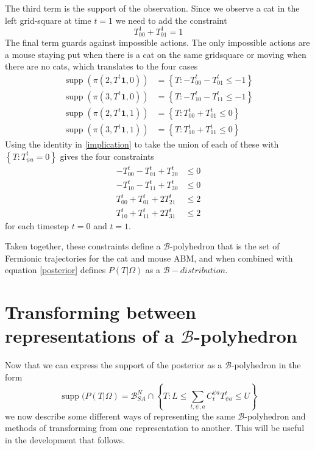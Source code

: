 \documentclass{article}
\DeclareMathOperator\supp{supp}
\begin{document}
The third term is the support of the observation. Since we observe a cat in the left grid-square at time $t=1$ we need to add the constraint
\[
T^1_{0 0} + T^1_{0 1} = 1
\]
The final term guards against impossible actions. The only impossible actions are a mouse staying put when there is a cat on the same gridsquare or moving when there are no cats, which translates to the four cases
\[
\begin{aligned}
\supp(\pi(2,T^t\mathbf{1},0)) &= \left\{ T: -T^t_{0 0} - T^t_{0 1} \le -1 \right\}\\
\supp(\pi(3,T^t\mathbf{1},0)) &= \left\{ T: -T^t_{1 0} - T^t_{1 1} \le -1 \right\}\\
\supp(\pi(2,T^t\mathbf{1},1)) &= \left\{ T: T^t_{0 0} + T^t_{0 1} \le 0 \right\}\\
\supp(\pi(3,T^t\mathbf{1},1)) &= \left\{ T: T^t_{1 0} + T^t_{1 1} \le 0 \right\}
\end{aligned}
\]
Using the identity in \eqref{implication} to take the union of each of these with $\left\{T: T^t_{\psi a} = 0\right\}$ gives the four constraints
\[
\begin{aligned}
-T^t_{0 0} - T^t_{0 1} + T^t_{2 0} & \le 0\\
-T^t_{1 0} - T^t_{1 1} + T^t_{3 0} & \le 0\\
T^t_{0 0} + T^t_{0 1} + 2T^t_{2 1} & \le 2 \\
T^t_{1 0} + T^t_{1 1} + 2T^t_{3 1} & \le 2
\end{aligned}
\]
for each timestep $t=0$ and $t=1$.

Taken together, these constraints define a $\mathcal{B}$-polyhedron that is the set of Fermionic trajectories for the cat and mouse ABM, and when combined with equation \eqref{posterior} defines $P(T|\Omega)$ as a $\mathcal{B}-distribution$.

\section{Transforming between representations of a $\mathcal{B}$-polyhedron}

Now that we can express the support of the posterior as a $\mathcal{B}$-polyhedron in the form
\begin{equation}
\supp(P(T|\Omega) = \mathcal{B}^N_{SA} \cap \left\{T: L \le \sum_{t,\psi,a} C^{\psi a}_t T^t_{\psi a} \le U \right\}
\label{bPolySupport}
\end{equation}
we now describe some different ways of representing the same $\mathcal{B}$-polyhedron and methods of transforming from one representation to another. This will be useful in the development that follows.
\end{document}
